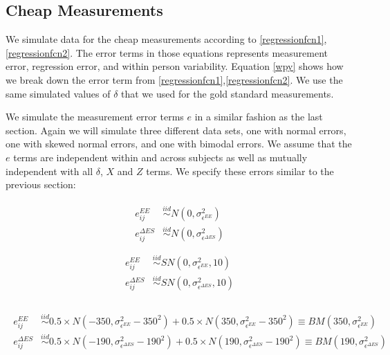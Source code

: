 \documentclass[11pt]{article}\usepackage[]{graphicx}\usepackage[]{color}
\begin{document}
\subsection{Cheap Measurements}

We simulate data for the cheap measurements according to \eqref{regressionfcn1}, \eqref{regressionfcn2}. The error terms in those equations represents measurement error, regression error, and within person variability. Equation \eqref{wpy} shows how we break down the error term from \eqref{regressionfcn1},\eqref{regressionfcn2}. We use the same simulated values  of $\delta$ that we used for the gold standard measurements.

We simulate the measurement error terms $e$ in a similar fashion as the last section. Again we will simulate three different data sets, one with normal errors, one with skewed normal errors, and one with bimodal errors. We assume that the $e$ terms are independent within and across subjects as well as mutually independent with all $\delta$, $X$ and $Z$ terms. We specify these errors similar to the previous section:

\begin{multicols}{2}
\noindent 
  \begin{align}
  \begin{split}
  \label{nerror2}
  e_{ij}^{EE} &\overset{iid}{\sim} N(0,\sigma_{\epsilon^{EE}}^2) \\
  e_{ij}^{\Delta ES} &\overset{iid}{\sim} N(0,\sigma_{\epsilon^{\Delta ES}}^2) \\
  \end{split}
  \end{align}
  \columnbreak
  \begin{align}
  \begin{split}
    \label{snerror2}
  e_{ij}^{EE} &\overset{iid}{\sim} SN(0,\sigma_{\epsilon^{EE}}^2,10) \\
  e_{ij}^{\Delta ES} &\overset{iid}{\sim} SN(0,\sigma_{\epsilon^{\Delta ES}}^2,10) \\
  \end{split}
  \end{align}
\end{multicols}


\begin{align}
  \begin{split}
  \label{bnerror2}
  e_{ij}^{EE} &\overset{iid}{\sim} 0.5\times N(-350,\sigma_{\epsilon^{EE}}^2-350^2) +
   0.5\times N(350,\sigma_{\epsilon^{EE}}^2-350^2) \equiv BM(350,\sigma_{\epsilon^{EE}}^2)\\
  e_{ij}^{\Delta ES} &\overset{iid}{\sim} 0.5\times N(-190,\sigma_{\epsilon^{\Delta ES}}^2-190^2) +  0.5\times N(190,\sigma_{\epsilon^{\Delta ES}}^2-190^2) \equiv BM(190,\sigma_{\epsilon^{\Delta ES}}^2)\\
  \end{split}
\end{align}
\end{document}
